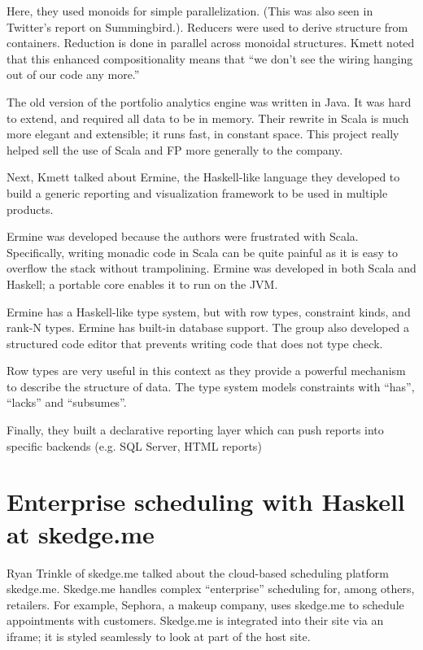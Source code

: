 \documentclass{jfp1}
\begin{document}
Here, they used monoids for simple parallelization. (This was also
seen in Twitter's report on Summingbird.). Reducers were used to
derive structure from containers.  Reduction
is done in parallel across monoidal structures. Kmett noted that this
enhanced compositionality means that ``we don't see the wiring hanging
out of our code any more.''

The old version of the portfolio analytics engine was written in Java.
It was hard to extend, and required all data to be in memory. Their
rewrite in Scala is much more elegant and extensible; it runs fast, in
constant space. This project really helped sell the use of Scala and
FP more generally to the company.

Next, Kmett talked about Ermine, the Haskell-like language they
developed to build a generic reporting and visualization framework to
be used in multiple products.

Ermine was developed because the authors were frustrated with Scala.
Specifically, writing monadic code in Scala can be quite painful as it
is easy to overflow the stack without trampolining. Ermine was developed
in both Scala and Haskell; a portable core enables it to run on the
JVM.

Ermine has a Haskell-like type system, but with row types, constraint
kinds, and rank-N types. Ermine has built-in database support. The
group also developed a structured code editor that prevents writing
code that does not type check.

Row types are very useful in this context as they provide a powerful mechanism
to describe the structure of data. The type system models constraints
with ``has'', ``lacks'' and ``subsumes''.

Finally, they built a declarative reporting layer which can push reports
into specific backends (e.g. SQL Server, HTML reports)

\section{Enterprise scheduling with Haskell at skedge.me}


Ryan Trinkle of skedge.me talked about the cloud-based scheduling
platform skedge.me. Skedge.me handles complex ``enterprise''
scheduling for, among others, retailers. For example, Sephora, a
makeup company, uses skedge.me to schedule appointments with
customers. Skedge.me is integrated into their site via an iframe; it
is styled seamlessly to look at part of the host site.
\end{document}
